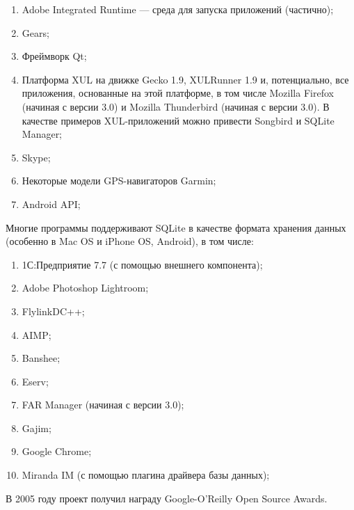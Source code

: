 \begin{enumerate}[label=--]
    \item Adobe Integrated Runtime — среда для запуска приложений (частично);
    \item Gears;
    \item Фреймворк Qt;
    \item Платформа XUL на движке Gecko 1.9, XULRunner 1.9 и, потенциально, все приложения, основанные на этой
          платформе, в том числе Mozilla Firefox (начиная с версии 3.0) и Mozilla Thunderbird (начиная с версии 3.0). В
          качестве примеров XUL-приложений можно привести Songbird и SQLite Manager; 
    \item Skype; 
    \item Некоторые модели GPS-навигаторов Garmin;
    \item Android API;
\end{enumerate}

Многие программы поддерживают SQLite в качестве формата хранения данных (особенно в Mac OS и iPhone OS, Android), в том
числе:

\begin{enumerate}[label=--]
    \item 1С:Предприятие 7.7 (с помощью внешнего компонента);
    \item Adobe Photoshop Lightroom;
    \item FlylinkDC++;
    \item AIMP;
    \item Banshee;
    \item Eserv;
    \item FAR Manager (начиная с версии 3.0);
    \item Gajim;
    \item Google Chrome;
    \item Miranda IM (с помощью плагина драйвера базы данных);
\end{enumerate}

В 2005 году проект получил награду Google-O’Reilly Open Source Awards.
